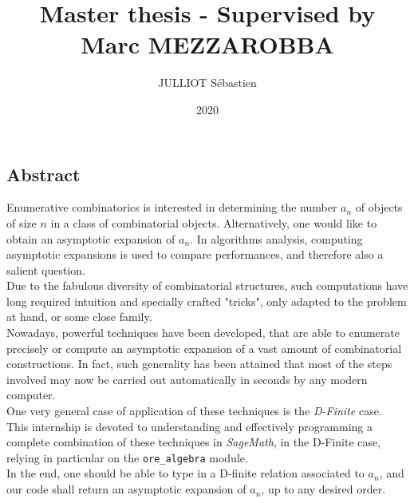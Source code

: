 \documentclass[a4paper, 12pt]{report}
\author{JULLIOT Sébastien}
\date{2020}
\title{Master thesis -	Supervised by Marc MEZZAROBBA}
\begin{document}


\clearpage
\vspace*{\fill}
\begin{center}
	\begin{minipage}{.8\textwidth}
		\begin{center}{\section*{Abstract}}\end{center}
		Enumerative combinatorics is interested in determining the number $a_n$ of objects of size $n$ in a class of combinatorial objects. Alternatively, one would like to obtain an asymptotic expansion of $a_n$. In algorithms analysis, computing asymptotic expansions is used to compare performances, and therefore also a salient question.\\
		
		Due to the fabulous diversity of combinatorial structures, such computations have long required intuition and specially crafted "tricks", only adapted to the problem at hand, or some close family.\\
		
		Nowadays, powerful techniques have been developed, that are able to enumerate precisely or compute an asymptotic expansion of a vast amount of combinatorial constructions. In fact, such generality has been attained that most of the steps involved may now be carried out automatically in seconds by any modern computer.\\
		
		One very general case of application of these techniques is the \textit{D-Finite} case.\\
		
		This internship is devoted to understanding and effectively programming a complete combination of these techniques in \textit{SageMath}, in the D-Finite case, relying in particular on the \verb|ore_algebra| module.\\
		
		In the end, one should be able to type in a D-finite relation associated to $a_n$, and our code shall return an asymptotic expansion of $a_n$, up to any desired order.
	\end{minipage}
\end{center}
\vfill %
\clearpage

\tableofcontents



\printbibliography
\end{document}
